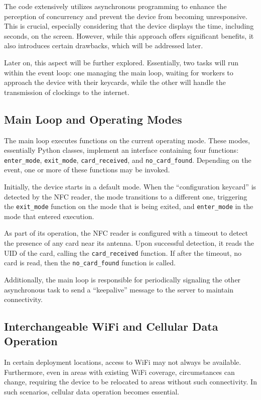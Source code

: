 The code extensively utilizes asynchronous programming to enhance the perception of concurrency 
and prevent the device from becoming unresponsive. This is crucial, especially considering that the 
device displays the time, including seconds, on the screen. However, while this approach offers 
significant benefits, it also introduces certain drawbacks, which will be addressed later.

Later on, this aspect will be further explored. Essentially, two tasks will run within the event 
loop: one managing the main loop, waiting for workers to approach the device with their keycards, 
while the other will handle the transmission of clockings to the internet.

\subsection{Main Loop and Operating Modes}

The main loop executes functions on the current operating mode. These modes, essentially Python 
classes, implement an interface containing four functions:\\ \texttt{enter\_mode}, 
\texttt{exit\_mode}, \texttt{card\_received}, and \texttt{no\_card\_found}. Depending on the event, 
one or more of these functions may be invoked.

Initially, the device starts in a default mode. When the ``configuration keycard'' is detected by 
the NFC reader, the mode transitions to a different one, triggering the \texttt{exit\_mode} 
function on the mode that is being exited, and \texttt{enter\_mode} in the mode that entered 
execution.

As part of its operation, the NFC reader is configured with a timeout to detect the presence of any 
card near its antenna. Upon successful detection, it reads the UID of the card, calling the 
\texttt{card\_received} function. If after the timeout, no card is read, then the 
\texttt{no\_card\_found} function is called.

Additionally, the main loop is responsible for periodically signaling the other asynchronous task 
to send a ``keepalive'' message to the server to maintain connectivity.

\subsection{Interchangeable WiFi and Cellular Data Operation}

In certain deployment locations, access to WiFi may not always be available. Furthermore, even in 
areas with existing WiFi coverage, circumstances can change, requiring the device to be relocated 
to areas without such connectivity. In such scenarios, cellular data operation becomes essential.

